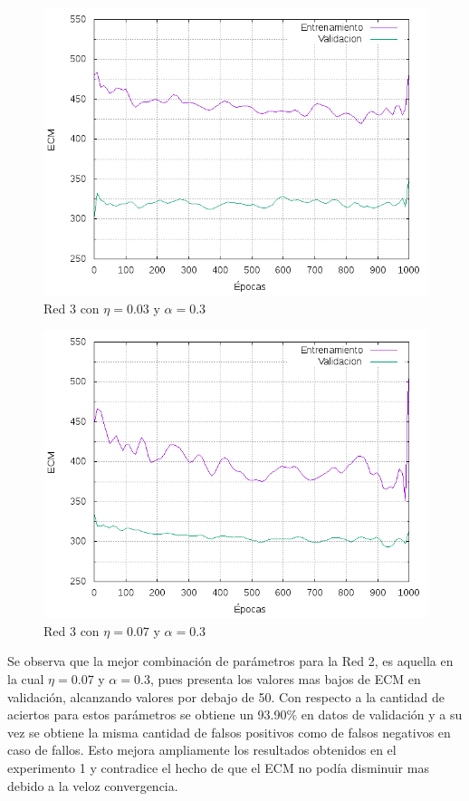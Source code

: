 \begin{figure}[H]
  \includegraphics[width=125mm]{imagenes/ej1/ex_2-3_red_11-6-6-9-1_errors.png}
  \caption{Red 3 con $\eta = 0.03 $ y $ \alpha = 0.3$}
\end{figure}

\begin{figure}[H]
  \includegraphics[width=125mm]{imagenes/ej1/ex_2-4_red_11-6-6-9-1_errors.png}
  \caption{Red 3 con $\eta = 0.07 $ y $ \alpha = 0.3$}
\end{figure}



Se observa que la mejor combinación de parámetros para la Red 2, es aquella en la cual $\eta = 0.07$ y $\alpha = 0.3$, pues presenta los valores
mas bajos de ECM en validación, alcanzando valores por debajo de 50. Con respecto a la cantidad de aciertos para estos parámetros se obtiene un
93.90\% en datos de validación y a su vez se obtiene la misma cantidad de falsos positivos como de falsos negativos en caso de fallos.
 Esto mejora ampliamente los resultados obtenidos en el experimento 1 y contradice el hecho de que el ECM no podía disminuir mas debido a la veloz
 convergencia.

